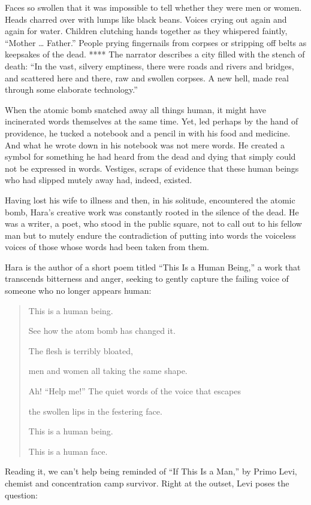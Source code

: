Faces so swollen that it was impossible to tell whether they were men or
women. Heads charred over with lumps like black beans. Voices crying out
again and again for water. Children clutching hands together as they
whispered faintly, ``Mother \ldots{} Father.'' People prying fingernails
from corpses or stripping off belts as keepsakes of the dead. **** The
narrator describes a city filled with the stench of death: ``In the
vast, silvery emptiness, there were roads and rivers and bridges, and
scattered here and there, raw and swollen corpses. A new hell, made real
through some elaborate technology.''

When the atomic bomb snatched away all things human, it might have
incinerated words themselves at the same time. Yet, led perhaps by the
hand of providence, he tucked a notebook and a pencil in with his food
and medicine. And what he wrote down in his notebook was not mere words.
He created a symbol for something he had heard from the dead and dying
that simply could not be expressed in words. Vestiges, scraps of
evidence that these human beings who had slipped mutely away had,
indeed, existed.

Having lost his wife to illness and then, in his solitude, encountered
the atomic bomb, Hara's creative work was constantly rooted in the
silence of the dead. He was a writer, a poet, who stood in the public
square, not to call out to his fellow man but to mutely endure the
contradiction of putting into words the voiceless voices of those whose
words had been taken from them.

Hara is the author of a short poem titled ``This Is a Human Being,'' a
work that transcends bitterness and anger, seeking to gently capture the
failing voice of someone who no longer appears human:

\begin{quote}
This is a human being.

See how the atom bomb has changed it.

The flesh is terribly bloated,

men and women all taking the same shape.

Ah! ``Help me!'' The quiet words of the voice that escapes

the swollen lips in the festering face.

This is a human being.

This is a human face.
\end{quote}

Reading it, we can't help being reminded of ``If This Is a Man,'' by
Primo Levi, chemist and concentration camp survivor. Right at the
outset, Levi poses the question:

